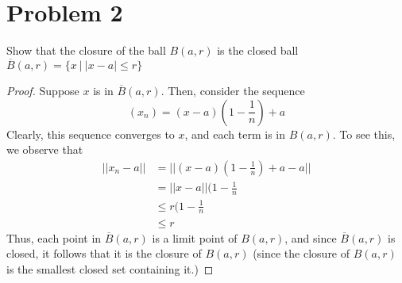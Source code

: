 \documentclass[fontsize=11pt]{scrartcl} %
\numberwithin{equation}{section} %
\numberwithin{figure}{section} %
\numberwithin{table}{section} %
\begin{document}
\newpage
\section*{Problem 2}
Show that the closure of the ball $B(a,r)$ is the closed ball $\overline{B}(a,r)=\{x\ |\ |x-a|\leq r\}$
\\
\begin{proof}
Suppose $x$ is in $\overline{B}(a,r)$. Then, consider the sequence
\[
(x_n) = (x-a)(1-\frac{1}{n}) + a
\]
Clearly, this sequence converges to $x$, and each term is in $B(a,r)$.
To see this, we observe that
\[
\begin{aligned}
||x_n-a|| &= ||(x-a)(1-\frac{1}{n}) + a - a||\\
          &= ||x-a||(1-\frac{1}{n}\\
            &\leq r(1-\frac{1}{n}\\
            &\leq r
\end{aligned}
\]
Thus, each point in $\overline{B}(a,r)$ is a limit point of $B(a,r)$, and since
$\overline{B}(a,r)$ is closed, it follows that it is the closure of $B(a,r)$ (since the 
closure of $B(a,r)$ is the smallest closed set containing it.)
\end{proof}

\newpage
\end{document}
